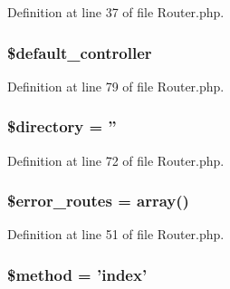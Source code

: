 Definition at line 37 of file Router.\-php.

\hypertarget{class_c_i___router_ab949cccd963058f0937d04bc26ee24a7}{
\subsubsection[{\$default\-\_\-controller}]{\setlength{\rightskip}{0pt plus 5cm}\$default\-\_\-controller}}\label{class_c_i___router_ab949cccd963058f0937d04bc26ee24a7}


Definition at line 79 of file Router.\-php.

\hypertarget{class_c_i___router_a1b07c630eb02f770a082a013373a16d6}{
\subsubsection[{\$directory}]{\setlength{\rightskip}{0pt plus 5cm}\$directory = ''}}\label{class_c_i___router_a1b07c630eb02f770a082a013373a16d6}


Definition at line 72 of file Router.\-php.

\hypertarget{class_c_i___router_a8fd5c23c355e91c5faac1e498ebe4ac9}{
\subsubsection[{\$error\-\_\-routes}]{\setlength{\rightskip}{0pt plus 5cm}\$error\-\_\-routes = array()}}\label{class_c_i___router_a8fd5c23c355e91c5faac1e498ebe4ac9}


Definition at line 51 of file Router.\-php.

\hypertarget{class_c_i___router_a12661b2fc0f57f97e30a1620889ce9c6}{
\subsubsection[{\$method}]{\setlength{\rightskip}{0pt plus 5cm}\$method = 'index'}}\label{class_c_i___router_a12661b2fc0f57f97e30a1620889ce9c6}


